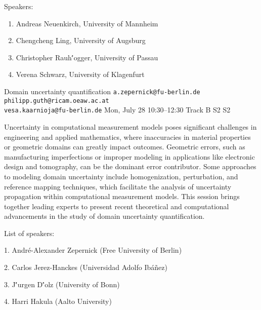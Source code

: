 \begin{talk}
\medskip





Speakers:





\begin{enumerate}


\item Andreas Neuenkirch, University of Mannheim


\item Chengcheng Ling, University of Augsburg


\item Christopher Rauh\''ogger, University of Passau


\item Verena Schwarz, University of Klagenfurt


\end{enumerate}








\end{talk}

\begin{talk}
  {Domain uncertainty quantification}%
  {{\tt a.zepernick@fu-berlin.de}\\{\tt philipp.guth@ricam.oeaw.ac.at}\\{\tt vesa.kaarnioja@fu-berlin.de}}%
  {}%
  {}%
  {}%
  {}%
  {Mon, July 28 10:30–12:30 Track B}%
  {S2}%
  {S2}%
  {}%
  {}%
  {}%
  {}%

Uncertainty in computational measurement models poses significant challenges in engineering and applied mathematics, where inaccuracies in material properties or geometric domains can greatly impact outcomes. Geometric errors, such as manufacturing imperfections or improper modeling in applications like electronic design and tomography, can be the dominant error contributor. Some approaches to modeling domain uncertainty include homogenization, perturbation, and reference mapping techniques, which facilitate the analysis of uncertainty propagation within computational measurement models. This session brings together leading experts to present recent theoretical and computational advancements in the study of domain uncertainty quantification.

List of speakers:

1. Andr\'e-Alexander Zepernick (Free University of Berlin)

2. Carlos Jerez-Hanckes (Universidad Adolfo Ib\'{a}\~{n}ez)

3. J\''urgen D\''olz (University of Bonn)

4. Harri Hakula (Aalto University)

\end{talk}

